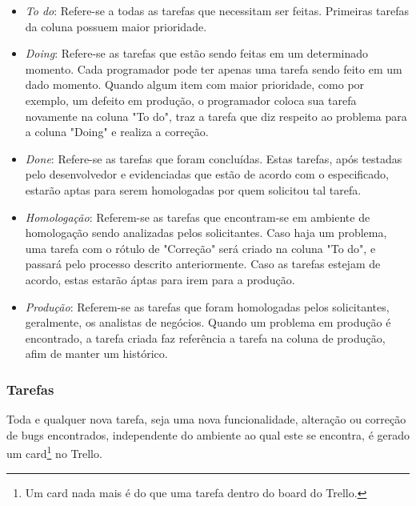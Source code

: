 \documentclass[11pt, a4paper]{article}
\begin{document}
\begin{itemize}
	\item \textit{To do}: Refere-se a todas as tarefas que necessitam ser feitas. Primeiras tarefas da coluna possuem maior prioridade.
	\item \textit{Doing}: Refere-se as tarefas que estão sendo feitas em um determinado momento. Cada programador pode ter apenas uma tarefa sendo feito em um dado momento. Quando algum item com maior prioridade, como por exemplo, um defeito em produção, o programador coloca sua tarefa novamente na coluna "To do", traz a tarefa que diz respeito ao problema para a coluna "Doing" e realiza a correção.
	\item \textit{Done}: Refere-se as tarefas que foram concluídas. Estas tarefas, após testadas pelo desenvolvedor e evidenciadas que estão de acordo com o especificado, estarão aptas para serem homologadas por quem solicitou tal tarefa.
	\item \textit{Homologação}: Referem-se as tarefas que encontram-se em ambiente de homologação sendo analizadas pelos solicitantes. Caso haja um problema, uma tarefa com o rótulo de "Correção" será criado na coluna "To do", e passará pelo processo descrito anteriormente. Caso as tarefas estejam de acordo, estas estarão áptas para irem para a produção.
	\item \textit{Produção}: Referem-se as tarefas que foram homologadas pelos solicitantes, geralmente, os analistas de negócios. Quando um problema em produção é encontrado, a tarefa criada faz referência a tarefa na coluna de produção, afim de manter um histórico.
\end{itemize}

\subsubsection{Tarefas}

Toda e qualquer nova tarefa, seja uma nova funcionalidade, alteração ou correção de bugs encontrados, independente do ambiente ao qual este se encontra, é gerado um card\footnote{Um card nada mais é do que uma tarefa dentro do board do Trello.} no Trello.
\end{document}
